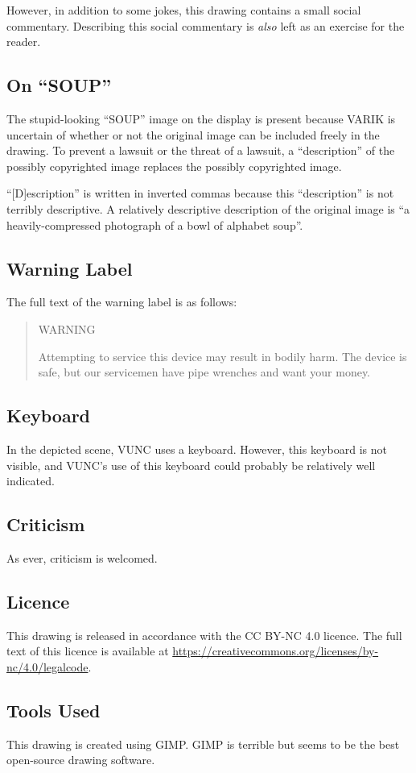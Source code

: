 \documentclass{report}
\begin{document}
However, in addition to some jokes, this drawing contains a small social commentary.  Describing this social commentary is \textit{also} left as an exercise for the reader.
\subsection{On ``SOUP''}
The stupid-looking ``SOUP'' image on the display is present because VARIK is uncertain of whether or not the original image can be included freely in the drawing.  To prevent a lawsuit or the threat of a lawsuit, a ``description'' of the possibly copyrighted image replaces the possibly copyrighted image.

``[D]escription'' is written in inverted commas because this ``description'' is not terribly descriptive.  A relatively descriptive description of the original image is ``a heavily-compressed photograph of a bowl of alphabet soup''.
\subsection{Warning Label}
The full text of the warning label is as follows:
\begin{quote}
	WARNING

	Attempting to service this device may result in bodily harm.  The device is safe, but our servicemen have pipe wrenches and want your money.
\end{quote}
\subsection{Keyboard}
In the depicted scene, VUNC uses a keyboard.  However, this keyboard is not visible, and VUNC's use of this keyboard could probably be relatively well indicated.
\subsection{Criticism}
As ever, criticism is welcomed.
\subsection{Licence}
This drawing is released in accordance with the CC BY-NC 4.0 licence.  The full text of this licence is available at \url{https://creativecommons.org/licenses/by-nc/4.0/legalcode}.
\subsection{Tools Used}
This drawing is created using GIMP\@.  GIMP is terrible but seems to be the best open-source drawing software.
\end{document}
